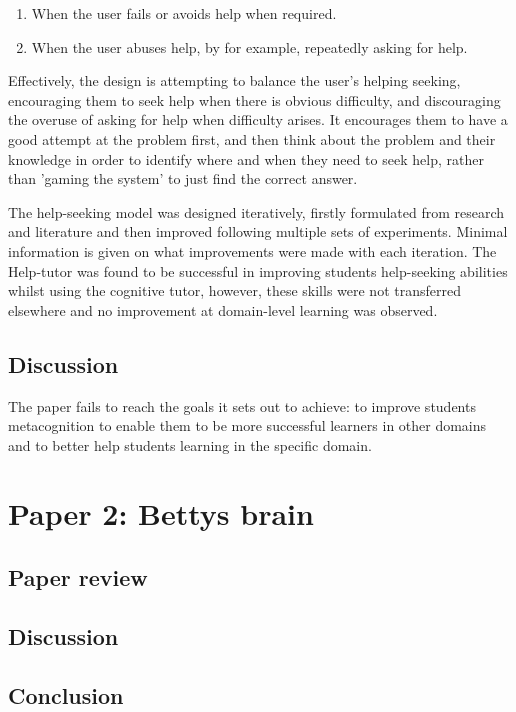 \documentclass[11pt]{article}
\begin{document}
\begin{enumerate}
\item When the user fails or avoids help when required.
\item When the user abuses help, by for example, repeatedly asking for help.
\end{enumerate}

Effectively, the design is attempting to balance the user’s helping seeking, encouraging them to seek help when there is obvious difficulty, and discouraging the overuse of asking for help when difficulty arises. It encourages them to have a good attempt at the problem first, and then think about the problem and their knowledge in order to identify where and when they need to seek help, rather than 'gaming the system' to just find the correct answer.

The help-seeking model was designed iteratively, firstly formulated from research and literature and then improved following multiple sets of experiments. Minimal information is given on what improvements were made with each iteration. The Help-tutor was found to be successful in improving students help-seeking abilities whilst using the cognitive tutor, however, these skills were not transferred elsewhere and no improvement at domain-level learning was observed. 


\subsection{Discussion}
The paper fails to reach the goals it sets out to achieve: to improve students metacognition to enable them to be more successful learners in other domains and to better help students learning in the specific domain. 

\section{Paper 2: Bettys brain}

\subsection{Paper review}

\subsection{Discussion}

\subsection{Conclusion}
\end{document}
